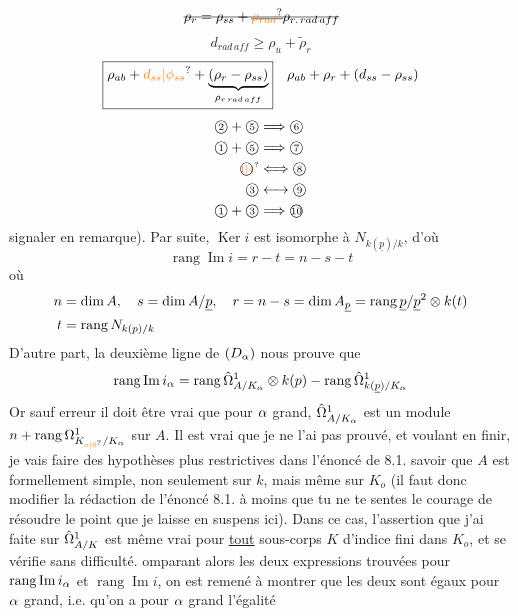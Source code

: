 \[
\deleted{\rho_r=\rho_{ss}+\deleted{\unsure{\rho_{rad}}}\rho_{r.\,rad\,aff}}
\]
\[
d_{rad\,aff}\geq\rho_u+\widetilde{\rho}_r
\]
\[
\boxed{\rho_{ab}+\unsure{d_{ss}|\phi_{ss}}+\underbrace{(\rho_r-\rho_{ss})}_{\rho_{r\,rad\,aff}}}
\quad \rho_{ab}+\rho_r+(d_{ss}-\rho_{ss})
\]
\[
\begin{aligned}
\text{\textcircled{\scriptsize 2}}+\text{\textcircled{\scriptsize 5}}&\Longrightarrow\text{\textcircled{\scriptsize 6}}\\
\text{\textcircled{\scriptsize 1}}+\text{\textcircled{\scriptsize 5}}&\Longrightarrow\text{\textcircled{\scriptsize 7}}\\
\text{\textcircled{\scriptsize\unsure{1|4}}}&\Longleftrightarrow\text{\textcircled{\scriptsize 8}}\\
\text{\textcircled{\scriptsize 3}}&\longleftrightarrow\text{\textcircled{\scriptsize 9}}\\
\text{\textcircled{\scriptsize 1}}+\text{\textcircled{\scriptsize 3}}&\Longrightarrow\text{\textcircled{\scriptsize 10}}
\end{aligned}
\]
signaler en remarque). Par suite, $\operatorname{Ker}i$ est isomorphe à $N_{k(\underline p)/k}$, d'où
\[
\operatorname{rang}\operatorname{Im}i=r-t=n-s-t
\]
où
\[
\begin{aligned}
n&=\dim A,\quad s=\dim A/\underline p,\quad r=n-s=\dim A_{\underline p}=\operatorname{rang}\underline p/\underline p^{2}\otimes k(t)\\
t&=\operatorname{rang}N_{k(p)/k}
\end{aligned}
\]
D'autre part, la deuxième ligne de $(D_{\alpha})$ nous prouve que
\[
\operatorname{rang}\operatorname{Im}i_{\alpha}
=\operatorname{rang}\hat\Omega^{1}_{A/K_{\alpha}}\otimes k(p)
-\operatorname{rang}\hat\Omega^{1}_{k(\underline p)/K_{\alpha}}
\]
Or  sauf erreur il doit être vrai que pour $\alpha$ grand, $\hat\Omega^{1}_{A/K_{\alpha}}$ est un module  $n+\operatorname{rang}\handwritten{\Omega}^{1}_{K_{\unsure{o|0}}/K_{\handwritten{\alpha}}}$ sur $A$. Il est vrai que je ne l'ai pas prouvé, et  voulant en finir, je vais faire des hypothèses plus restrictives dans l'énoncé de 8.1. savoir que $A$ est formellement simple, non seulement sur $k$, mais même sur $K_o$ (il faut donc modifier la rédaction de l'énoncé 8.1. à moins que tu ne te sentes le courage de résoudre le point que je laisse en suspens ici). Dans ce cas, l'assertion que j'ai faite sur $\hat\Omega^{1}_{A/K}$ est même vrai pour \uline{tout} sous-corps $K$ d'indice fini dans $K_o$, et se vérifie sans difficulté. omparant alors les deux expressions trouvées pour $\operatorname{rang}\operatorname{Im}i_{\alpha}$ et $\operatorname{rang}\operatorname{Im}i$, on est remené à montrer que les deux sont égaux pour $\alpha$ grand, i.e. qu'on a pour $\alpha$ grand l'égalité
